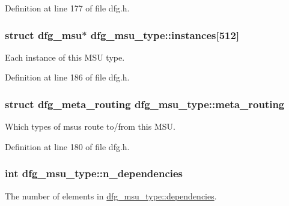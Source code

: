 Definition at line 177 of file dfg.\-h.

\hypertarget{structdfg__msu__type_aac780324344ec376a3dc3d18704ca7c6}{
\subsubsection[{instances}]{\setlength{\rightskip}{0pt plus 5cm}struct {\bf dfg\-\_\-msu}$\ast$ dfg\-\_\-msu\-\_\-type\-::instances\mbox{[}512\mbox{]}}}\label{structdfg__msu__type_aac780324344ec376a3dc3d18704ca7c6}


Each instance of this M\-S\-U type. 



Definition at line 186 of file dfg.\-h.

\hypertarget{structdfg__msu__type_ac9778638f0dc0bd6e0139f2181ea5f13}{
\subsubsection[{meta\-\_\-routing}]{\setlength{\rightskip}{0pt plus 5cm}struct {\bf dfg\-\_\-meta\-\_\-routing} dfg\-\_\-msu\-\_\-type\-::meta\-\_\-routing}}\label{structdfg__msu__type_ac9778638f0dc0bd6e0139f2181ea5f13}


Which types of msus route to/from this M\-S\-U. 



Definition at line 180 of file dfg.\-h.

\hypertarget{structdfg__msu__type_a7415469cbf6b8a856375aa211c4732c2}{
\subsubsection[{n\-\_\-dependencies}]{\setlength{\rightskip}{0pt plus 5cm}int dfg\-\_\-msu\-\_\-type\-::n\-\_\-dependencies}}\label{structdfg__msu__type_a7415469cbf6b8a856375aa211c4732c2}


The number of elements in \hyperlink{structdfg__msu__type_ae99af1194aeded6b89928e96dfb054d4}{dfg\-\_\-msu\-\_\-type\-::dependencies}. 



